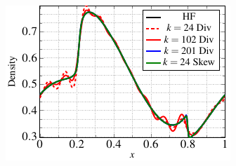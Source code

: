 \begin{figure}
\begin{subfigure}[]{0.47\linewidth}
        \includegraphics[scale=1]{Figures/paper-figure19.pdf}

\end{subfigure}
\end{figure}
